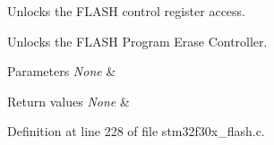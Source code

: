 Unlocks the F\-L\-A\-S\-H control register access. 

Unlocks the F\-L\-A\-S\-H Program Erase Controller.


\begin{DoxyParams}{Parameters}
{\em None} & \\
\hline
\end{DoxyParams}

\begin{DoxyRetVals}{Return values}
{\em None} & \\
\hline
\end{DoxyRetVals}


Definition at line 228 of file stm32f30x\-\_\-flash.\-c.

